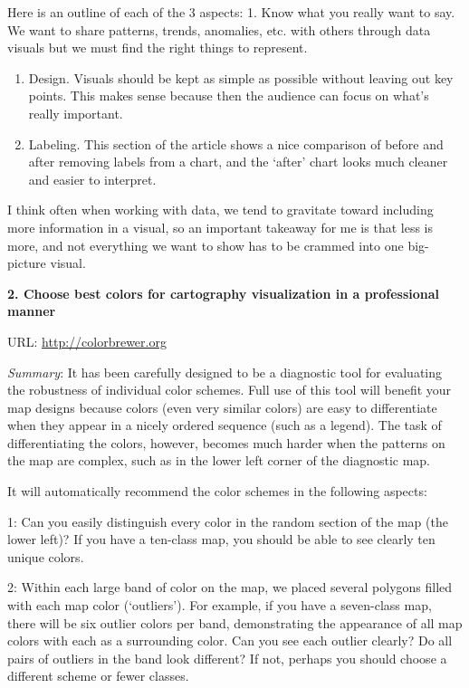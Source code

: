 \documentclass[]{book}
\theoremstyle{definition}
\theoremstyle{definition}
\theoremstyle{definition}
\theoremstyle{remark}
\begin{document}
Here is an outline of each of the 3 aspects: 1. Know what you really
want to say. We want to share patterns, trends, anomalies, etc. with
others through data visuals but we must find the right things to
represent.

\begin{enumerate}
\def\labelenumi{\arabic{enumi}.}
\setcounter{enumi}{1}
\item
  Design. Visuals should be kept as simple as possible without leaving
  out key points. This makes sense because then the audience can focus
  on what's really important.
\item
  Labeling. This section of the article shows a nice comparison of
  before and after removing labels from a chart, and the `after' chart
  looks much cleaner and easier to interpret.
\end{enumerate}

I think often when working with data, we tend to gravitate toward
including more information in a visual, so an important takeaway for me
is that less is more, and not everything we want to show has to be
crammed into one big-picture visual.

\textbf{2. Choose best colors for cartography visualization in a
professional manner}

URL: \url{http://colorbrewer.org}

\emph{Summary}: It has been carefully designed to be a diagnostic tool
for evaluating the robustness of individual color schemes. Full use of
this tool will benefit your map designs because colors (even very
similar colors) are easy to differentiate when they appear in a nicely
ordered sequence (such as a legend). The task of differentiating the
colors, however, becomes much harder when the patterns on the map are
complex, such as in the lower left corner of the diagnostic map.

It will automatically recommend the color schemes in the following
aspects:

1: Can you easily distinguish every color in the random section of the
map (the lower left)? If you have a ten-class map, you should be able to
see clearly ten unique colors.

2: Within each large band of color on the map, we placed several
polygons filled with each map color (`outliers'). For example, if you
have a seven-class map, there will be six outlier colors per band,
demonstrating the appearance of all map colors with each as a
surrounding color. Can you see each outlier clearly? Do all pairs of
outliers in the band look different? If not, perhaps you should choose a
different scheme or fewer classes.
\end{document}
